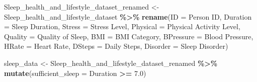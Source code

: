 \documentclass[
  11pt,
]{article}
\newenvironment{Shaded}{\begin{snugshade}}{\end{snugshade}}
\newcommand{\AttributeTok}[1]{\textcolor[rgb]{0.13,0.29,0.53}{#1}}
\newcommand{\FloatTok}[1]{\textcolor[rgb]{0.00,0.00,0.81}{#1}}
\newcommand{\FunctionTok}[1]{\textcolor[rgb]{0.13,0.29,0.53}{\textbf{#1}}}
\newcommand{\NormalTok}[1]{#1}
\newcommand{\OtherTok}[1]{\textcolor[rgb]{0.56,0.35,0.01}{#1}}
\newcommand{\SpecialCharTok}[1]{\textcolor[rgb]{0.81,0.36,0.00}{\textbf{#1}}}
\newcommand{\StringTok}[1]{\textcolor[rgb]{0.31,0.60,0.02}{#1}}
\begin{document}
\begin{Shaded}
\begin{Highlighting}[]
\NormalTok{Sleep\_health\_and\_lifestyle\_dataset\_renamed }\OtherTok{\textless{}{-}}\NormalTok{ Sleep\_health\_and\_lifestyle\_dataset }\SpecialCharTok{\%\textgreater{}\%}
  \FunctionTok{rename}\NormalTok{(}\AttributeTok{ID =} \StringTok{\textquotesingle{}Person ID\textquotesingle{}}\NormalTok{,}
         \AttributeTok{Duration =} \StringTok{\textquotesingle{}Sleep Duration\textquotesingle{}}\NormalTok{,}
         \AttributeTok{Stress =} \StringTok{\textquotesingle{}Stress Level\textquotesingle{}}\NormalTok{,}
         \AttributeTok{Physical =} \StringTok{\textquotesingle{}Physical Activity Level\textquotesingle{}}\NormalTok{,}
         \AttributeTok{Quality =} \StringTok{\textquotesingle{}Quality of Sleep\textquotesingle{}}\NormalTok{,}
         \AttributeTok{BMI =} \StringTok{\textquotesingle{}BMI Category\textquotesingle{}}\NormalTok{,}
         \AttributeTok{BPressure =} \StringTok{\textquotesingle{}Blood Pressure\textquotesingle{}}\NormalTok{,}
         \AttributeTok{HRate =} \StringTok{\textquotesingle{}Heart Rate\textquotesingle{}}\NormalTok{,}
         \AttributeTok{DSteps =} \StringTok{\textquotesingle{}Daily Steps\textquotesingle{}}\NormalTok{,}
         \AttributeTok{Disorder =} \StringTok{\textquotesingle{}Sleep Disorder\textquotesingle{}}\NormalTok{)}


\NormalTok{sleep\_data }\OtherTok{\textless{}{-}}\NormalTok{ Sleep\_health\_and\_lifestyle\_dataset\_renamed }\SpecialCharTok{\%\textgreater{}\%}
    \FunctionTok{mutate}\NormalTok{(}\AttributeTok{sufficient\_sleep =}\NormalTok{ Duration }\SpecialCharTok{\textgreater{}=} \FloatTok{7.0}\NormalTok{)}
\end{Highlighting}
\end{Shaded}
\end{document}
